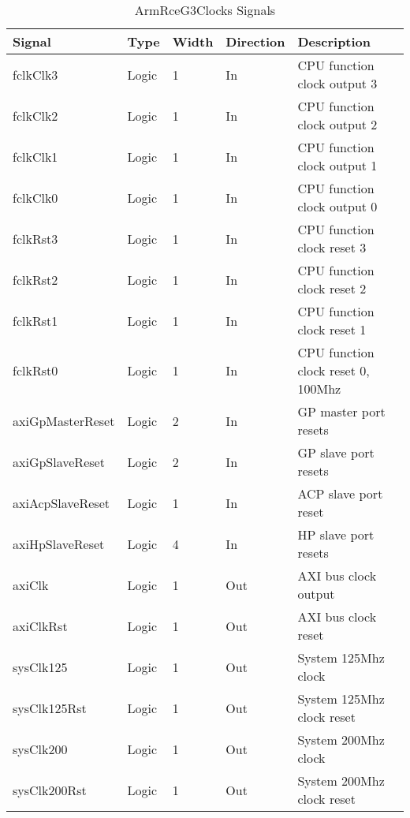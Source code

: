 \documentclass[11pt]{article}
\begin{document}
\begin{table}[H]
\small
\centering
   \begin{tabular}{| l | l | l | l | l | } 
      \hline \textbf{Signal}            & \textbf{Type} & \textbf{Width} & \textbf{Direction} & \textbf{Description} \\
      \hline fclkClk3          & Logic   & 1  & In       & CPU function clock output 3        \\
      \hline fclkClk2          & Logic   & 1  & In       & CPU function clock output 2        \\
      \hline fclkClk1          & Logic   & 1  & In       & CPU function clock output 1        \\
      \hline fclkClk0          & Logic   & 1  & In       & CPU function clock output 0        \\
      \hline fclkRst3          & Logic   & 1  & In       & CPU function clock reset 3         \\
      \hline fclkRst2          & Logic   & 1  & In       & CPU function clock reset 2         \\
      \hline fclkRst1          & Logic   & 1  & In       & CPU function clock reset 1         \\
      \hline fclkRst0          & Logic   & 1  & In       & CPU function clock reset 0, 100Mhz \\
      \hline axiGpMasterReset  & Logic   & 2  & In       & GP master port resets              \\
      \hline axiGpSlaveReset   & Logic   & 2  & In       & GP slave port resets               \\
      \hline axiAcpSlaveReset  & Logic   & 1  & In       & ACP slave port reset               \\
      \hline axiHpSlaveReset   & Logic   & 4  & In       & HP slave port resets               \\
      \hline axiClk            & Logic   & 1  & Out      & AXI bus clock output               \\
      \hline axiClkRst         & Logic   & 1  & Out      & AXI bus clock reset                \\
      \hline sysClk125         & Logic   & 1  & Out      & System 125Mhz clock                \\
      \hline sysClk125Rst      & Logic   & 1  & Out      & System 125Mhz clock reset          \\
      \hline sysClk200         & Logic   & 1  & Out      & System 200Mhz clock                \\
      \hline sysClk200Rst      & Logic   & 1  & Out      & System 200Mhz clock reset          \\
      \hline
   \end{tabular}
   \caption{ArmRceG3Clocks Signals}
   \label{tab:clk_gen_signals}
\end{table}
\end{document}
